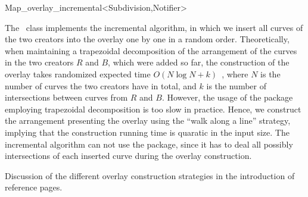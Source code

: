 
\ccRefPageBegin


\renewcommand{\ccRefPageBegin}{\begin{ccAdvanced}}
\renewcommand{\ccRefPageEnd}{\end{ccAdvanced}}

\begin{ccRefClass}{Map_overlay_incremental<Subdivision,Notifier>}
\label{OVL_sec:incremental}

The \ccRefName\ class implements the incremental algorithm,
in which we insert all curves of the two creators into the overlay 
one by one in a random order. 
Theoretically, when maintaining a trapezoidal decomposition of the 
arrangement of the curves in the two creators $R$ and $B$, 
which were added so far, 
the construction of the overlay takes randomized expected time 
$O(N\log{N} + k)$~\cite{m-cgitr-93},
where $N$ is the number of curves the two creators have in total, 
and $k$ is the number of intersections between curves 
from $R$ and $B$. 
However, the usage of the 
package employing trapezoidal decomposition is too slow in practice. 
Hence, we construct the arrangement presenting the overlay 
using the ``walk along a line'' strategy, 
implying that the construction running time is quaratic in the input size.
The incremental algorithm can not use the 
 package, since it has to deal all possibly 
intersections of each inserted curve during the overlay construction.



\ccIsModel

\ccInheritsFrom

\ccSeeAlso
   Discussion of the different overlay construction strategies in the introduction
of  reference pages.

\end{ccRefClass}
\renewcommand{\ccRefPageBegin}{}
\renewcommand{\ccRefPageEnd}{}


\ccRefPageEnd
